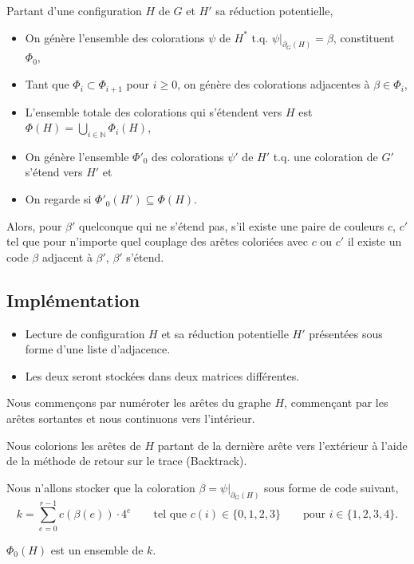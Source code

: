 \documentclass{beamer}
\begin{document}
\begin{frame}
Partant d'une configuration $H$ de $G$ et $H'$ sa réduction potentielle,
\begin{itemize}
\item On génère l'ensemble des colorations $\psi$ de $H^*$ t.q. $\psi|_{\partial_G(H)} = \beta$, constituent $\Phi_0$,
\item Tant que $\Phi_i \subset \Phi_{i+1}$ pour $i \geq 0$, on génère des colorations adjacentes à $\beta \in \Phi_i$,
\item L'ensemble totale des colorations qui s'étendent vers $H$ est $\Phi(H) = \bigcup_{i \in \mathbb{N}} \Phi_i(H)$,
\item On génère l'ensemble $\Phi'_0$ des colorations $\psi'$ de $H'$ t.q. une coloration de $G'$ s'étend vers $H'$ et
\item On regarde si $\Phi'_0(H') \subseteq \Phi(H)$.
\end{itemize}
\end{frame}

\begin{frame}
Alors,
pour $\beta'$ quelconque qui ne s'étend pas,
s'il existe une paire de couleurs $c$, $c'$ tel que pour n'importe quel couplage des arêtes coloriées avec $c$ ou $c'$ il existe un code $\beta$ adjacent à $\beta'$, $\beta'$ s'étend.
\end{frame}

\subsection{Implémentation}

\begin{frame}
\begin{itemize}
\item Lecture de configuration $H$ et sa réduction potentielle $H'$ présentées sous forme d'une liste d'adjacence.
\item Les deux seront stockées dans deux matrices différentes.
\end{itemize}
\end{frame}

\begin{frame}

Nous commençons par numéroter les arêtes du graphe $H$, commençant par les arêtes sortantes et nous continuons vers l'intérieur.

Nous colorions les arêtes de $H$ partant de la dernière arête vers l'extérieur à l'aide de la méthode de retour sur le trace (Backtrack).

Nous n'allons stocker que la coloration $\beta=\psi|_{\partial_G(H)}$ sous forme de code suivant,
$$
k = \sum_{e=0}^{r-1} c(\beta(e)) \cdot 4^{e} \qquad \textrm{tel que   } c(i) \in \{ 0,1,2,3 \} \qquad \textrm{pour  } i \in \{1,2,3,4 \}.
$$

$\Phi_0(H)$ est un ensemble de $k$.
\end{frame}
\end{document}

